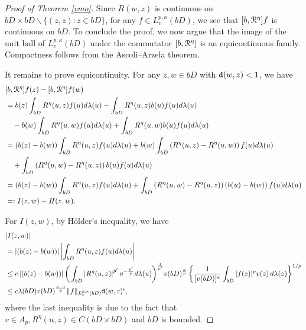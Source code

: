 \documentclass[11pt,a4paper]{amsart}
\numberwithin{equation}{section}
\begin{document}
{\begin{proof}[Proof of   Theorem \ref{vmo}]
Since $R(w,z)$ is continuous on  $bD\times bD\backslash \{(z,z): z\in bD\}$, for any $f\in L_v^{p,\kappa}(bD)$, we  see that $[b, \EuScript R^\eta]f$ is continuous on $bD$.
\color{black}
To conclude the proof, we now argue that the image of the unit ball of $L_v^{p,\kappa}(bD)$ under the commutator
$[b, \EuScript R^\eta] $ is an equicontinuous family.  Compactness follows from the  Ascoli--Arzela theorem.
\color{black}

It remains to prove equicontinuity.  For any $z,w\in bD$ with ${\tt d}(w,z)<1$, we have
\begin{align*}
&[b, \EuScript R^\eta]f(z)-[b, \EuScript R^\eta]f(w)\\
&=b(z)\int_{bD}R^\eta(u,z)f(u)d\lambda(u)-\int_{bD}R^\eta(u,z)b(u)f(u)d\lambda(u)\\
&\quad -b(w)\int_{bD}R^\eta(u,w)f(u)d\lambda(u)+\int_{bD}R^\eta(u,w)b(u)f(u)d\lambda(u)\\
&=(b(z)-b(w))\int_{bD}R^\eta(u,z)f(u)d\lambda(u)+b(w)\int_{bD}\left(R^\eta(u,z)- R^\eta(u,w)\right)f(u)d\lambda(u)\\
&\quad+\int_{bD}\left(R^\eta(u,w)-R^\eta(u,z)\right)b(u)f(u)d\lambda(u)\\
&=(b(z)-b(w))\int_{bD}R^\eta(u,z)f(u)d\lambda(u)
+\int_{bD}\left(R^\eta(u,w)-R^\eta(u,z)\right)\left(b(u)-b(w)\right)f(u)d\lambda(u)\\
&=:I(z,w)+I\!I(z,w).
\end{align*}


For $I(z,w)$, by H\"older's inequality, we have
\begin{align*}
&|I(z,w)|\\
&=\left|(b(z)-b(w))\right| \left|\int_{bD}R^\eta(u,z)f(u)d\lambda(u)\right|\\
&\leq c\left|(b(z)-b(w))\right|\bigg(\int_{bD}\left|R^\eta(u,z)\right|^{p'}v^{-{p'\over p}}d\lambda(u) \bigg)^{1\over p'}v(bD)^{{\kappa\over p}}\left\{\frac{1}{[v(bD)]^\kappa}\int_{bD}|f(z)|^pv(z)\,d\lambda(z)\right\}^{1/p}\\
&\leq {c \lambda(bD)v(bD)^{{\kappa-1\over p}}\|f\|_{L_v^{p,\kappa}(bD)}{\tt d}(w,z)^\epsilon},
\end{align*}
 {where the last inequality is due to the fact that $v\in A_p, R^\eta(u,z)\in C(bD\times bD)$ and $bD$ is bounded.}




\end{proof}}
\end{document}
